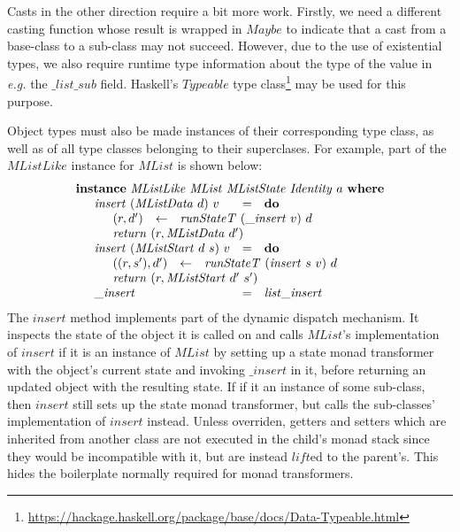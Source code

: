 \documentclass[authoryear,preprint]{sigplanconf}
\begin{document}
Casts in the other direction require a bit more work. Firstly, we need a different casting function whose result is wrapped in $\mathit{Maybe}$ to indicate that a cast from a base-class to a sub-class may not succeed. However, due to the use of existential types, we also require runtime type information about the type of the value in \emph{e.g.} the $\_\mathit{list}\_\mathit{sub}$ field. Haskell's $\mathit{Typeable}$ type class\footnote{\url{https://hackage.haskell.org/package/base/docs/Data-Typeable.html}} may be used for this purpose.

Object types must also be made instances of their corresponding type class, as well as of all type classes belonging to their superclases. For example, part of the $\mathit{MListLike}$ instance for $\mathit{MList}$ is shown below:
\begin{displaymath}
\begin{array}{l}
\mathbf{instance}~\mathit{MListLike}~\mathit{MList}~\mathit{MListState}~\mathit{Identity}~a~\mathbf{where} \\
\quad \begin{array}{lcl}
\mathit{insert}~(\mathit{MListData}~d)~v & = & \mathbf{do} \\
\multicolumn{3}{l}{\quad \begin{array}{lcl}
    (r,d') & \leftarrow & \mathit{runStateT}~(\_\mathit{insert}~v)~d \\
    \multicolumn{3}{l}{\mathit{return}~(r,\mathit{MListData}~d')}
    \end{array}} \\
\mathit{insert}~(\mathit{MListStart}~d~s)~v & = & \mathbf{do} \\
\multicolumn{3}{l}{\quad \begin{array}{lcl}
    ((r,s'),d') & \leftarrow & \mathit{runStateT}~(\mathit{insert}~s~v)~d \\
    \multicolumn{3}{l}{\mathit{return}~(r,\mathit{MListStart}~d'~s')}
    \end{array}} \\
\_\mathit{insert} & = & \mathit{list}\_\mathit{insert}
\end{array}
\end{array}
\end{displaymath}
The $\mathit{insert}$ method implements part of the dynamic dispatch mechanism. It inspects the state of the object it is called on and calls $\mathit{MList}$'s implementation of $\mathit{insert}$ if it is an instance of $\mathit{MList}$ by setting up a state monad transformer with the object's current state and invoking $\_\mathit{insert}$ in it, before returning an updated object with the resulting state. If if it an instance of some sub-class, then $\mathit{insert}$ still sets up the state monad transformer, but calls the sub-classes' implementation of $\mathit{insert}$ instead. Unless overriden, getters and setters which are inherited from another class are not executed in the child's monad stack since they would be incompatible with it, but are instead $\mathit{lift}$ed to the parent's. This hides the boilerplate normally required for monad transformers.
\end{document}
